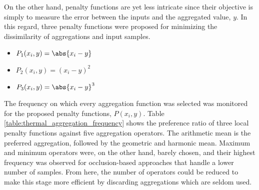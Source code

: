 On the other hand, penalty functions are yet less intricate since their objective is simply to measure the error between the inputs and the aggregated value, $y$. In this regard, three penalty functions \cite{paternain_color_2012} were proposed for minimizing the dissimilarity of aggregations and input samples. 
\begin{itemize}
    \setlength\itemsep{0.5em}
    \item $P_1(x_i, y) = \abs{x_i - y}$
    \item $P_2(x_i, y) = (x_i - y)^2$
    \item $P_3(x_i, y) = {\abs{x_i - y}}^3$
\end{itemize}

The frequency on which every aggregation function was selected was monitored for the proposed penalty functions, $P(x_i, y)$. Table \ref{table:thermal_aggregation_frequency} shows the preference ratio of three local penalty functions against five aggregation operators. The arithmetic mean is the preferred aggregation, followed by the geometric and harmonic mean. Maximum and minimum operators were, on the other hand, barely chosen, and their highest frequency was observed for occlusion-based approaches that handle a lower number of samples. From here, the number of operators could be reduced to make this stage more efficient by discarding aggregations which are seldom used.

